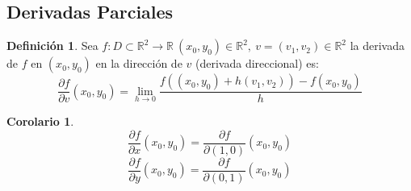 \documentclass[10pt]{article}
\theoremstyle{definition}
\newtheorem{definition}{Definición}[section]
\newtheorem{corollary}{Corolario}[theorem]
\begin{document}
\subsection{Derivadas Parciales}
\begin{definition}
    Sea $f:D\subset\mathbb{R}^2\to\mathbb{R}\ (x_0,y_0)\in\mathbb{R}^2,\ v=(v_1,v_2)\in\mathbb{R}^2$ la derivada de $f$ en $(x_0,y_0)$ en la dirección de $v$ (derivada direccional) es: $$\frac{\partial f}{\partial v}(x_0,y_0)=\lim_{h \to 0}\frac{f((x_0,y_0)+h(v_1,v_2))-f(x_0,y_0)}{h}$$ 
\end{definition}
\begin{corollary}
    $$\frac{\partial f}{\partial x}(x_0,y_0)=\frac{\partial f}{\partial (1,0)} (x_0,y_0)$$
    $$\frac{\partial f}{\partial y} (x_0,y_0)=\frac{\partial f}{\partial (0,1)} (x_0,y_0)$$
\end{corollary}
\end{document}
